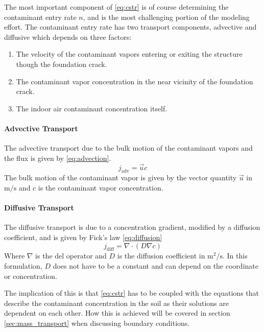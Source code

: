 The most important component of \eqref{eq:cstr} is of course determining the contaminant entry rate $n$, and is the most challenging portion of the modeling effort.
The contaminant entry rate has two transport components, advective and diffusive which depends on three factors:
\begin{enumerate}
  \item The velocity of the contaminant vapors entering or exiting the structure though the foundation crack.
  \item The contaminant vapor concentration in the near vicinity of the foundation crack.
  \item The indoor air contaminant concentration itself.
\end{enumerate}

\paragraph{Advective Transport}

The advective transport due to the bulk motion of the contaminant vapors and the flux is given by \eqref{eq:advection}.
\begin{equation}\label{eq:advection} %
  j_\mathrm{adv} = \vec{u} c
\end{equation}
The bulk motion of the contaminant vapor is given by the vector quantity $\vec{u}$ in $\mathrm{m/s}$ and $c$ is the contaminant vapor concentration.\par

\paragraph{Diffusive Transport}

The diffusive transport is due to a concentration gradient, modified by a diffusion coefficient, and is given by Fick's law \eqref{eq:diffusion}
\begin{equation}\label{eq:diffusion}
  j_\mathrm{diff} = \nabla \cdot (D\nabla c)
\end{equation}
Where $\nabla$ is the del operator and $D$ is the diffusion coefficient in $\mathrm{m^2/s}$.
In this formulation, $D$ does not have to be a constant and can depend on the coordinate or concentration.\par

The implication of this is that \eqref{eq:cstr} has to be coupled with the equations that describe the contaminant concentration in the soil as their solutions are dependent on each other.
How this is achieved will be covered in section \ref{sec:mass_transport} when discussing boundary conditions.\par

